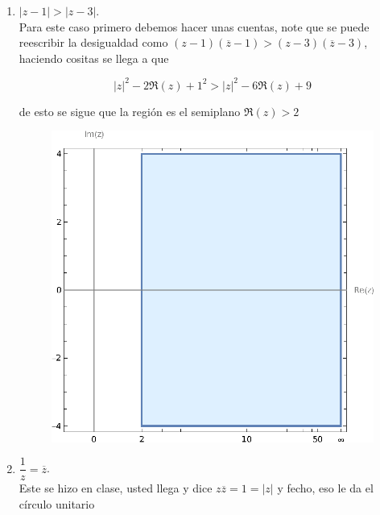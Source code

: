 \documentclass[11pt]{article}
\begin{document}
\begin{enumerate}
\begin{enumerate}
        \item $|z - 1| > |z - 3|$.\\

        Para este caso primero debemos hacer unas cuentas, note que se puede reescribir la desigualdad como $(z-1)(\overline{z}-1)>(z-3)(\overline{z}-3)$, haciendo cositas se llega a que

        $$|z|^2-2 \Re(z)+1^2>|z|^2-6 \Re(z)+9 $$

        de esto se sigue que la región es el semiplano $\Re(z)>2$

         \begin{figure}[H]
         \centering
         \includegraphics[scale=0.8]{Graphics/R2.eps}
         \end{figure} 

        \item $\dfrac{1}{z} = \overline{z}$.\\

        Este se hizo en clase, usted llega y dice $z \overline{z}=1=|z|$ y fecho, eso le da el círculo unitario\\


\end{enumerate}
\end{enumerate}
\end{document}
